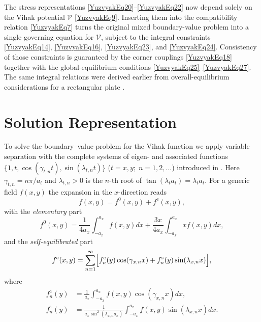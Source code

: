 The stress representations \eqref{YuzvyakEq20}–\eqref{YuzvyakEq22} now
depend solely on the Vihak potential
\(\mathcal{V}\) \eqref{YuzvyakEq9}.  Inserting them into the
compatibility relation \eqref{YuzvyakEq7} turns the original mixed
boundary-value problem into a single governing equation for
\(\mathcal{V}\), subject to the integral constraints
\eqref{YuzvyakEq14}, \eqref{YuzvyakEq16},
\eqref{YuzvyakEq23}, and \eqref{YuzvyakEq24}.  Consistency of those
constraints is guaranteed by the corner couplings
\eqref{YuzvyakEq18} together with the global-equilibrium conditions
\eqref{YuzvyakEq25}–\eqref{YuzvyakEq27}.  The same integral
relations were derived earlier from overall-equilibrium considerations
for a rectangular plate \cite{Yuzvyak32,Yuzvyak33}.

\section{Solution Representation}

To solve the boundary–value problem for the Vihak function we apply
variable separation with the complete systems of eigen- and associated
functions  
\(\{1,t,\cos(\gamma_{t,n}t),\sin(\lambda_{t,n}t)\}\)  
(\(t=x,y;\;n=1,2,\dots\)) introduced in
\cite{Yuzvyak29,Yuzvyak30}.  Here
\(\gamma_{t,n}=n\pi/a_{t}\) and \(\lambda_{t,n}>0\) is the \(n\)-th root
of \(\tan(\lambda_{t}a_{t})=\lambda_{t}a_{t}\).
For a generic field \(f(x,y)\) the expansion in the \(x\)-direction
reads
\begin{equation}
	f(x,y)=f^{0}(x,y)+f^{\mathrm e}(x,y),
	\label{YuzvyakEq28}
\end{equation}
with the \emph{elementary} part
\begin{equation}
	f^{0}(x,y)=
	\frac{1}{4a_{x}}\int_{-a_{x}}^{a_{x}}f(x,y) dx
	+\frac{3x}{4a_{x}}\int_{-a_{x}}^{a_{x}}x f(x,y) dx,
	\label{YuzvyakEq29}
\end{equation}
and the \emph{self-equilibrated} part
\begin{equation}
	f^{\mathrm e}(x,y)=
	\sum_{n=1}^{\infty} \Bigl[
	f_{n}^{\mathrm c}(y)\cos(\gamma_{x,n}x)
	+f_{n}^{\mathrm s}(y)\sin(\lambda_{x,n}x)
	\Bigr],
	\label{YuzvyakEq30}
\end{equation}
where
\begin{equation}\label{YuzvyakEq31}
\begin{array}{ll}
	f_{n}^{\mathrm c}(y)&=\frac{1}{a_{x}}
	\int_{-a_{x}}^{a_{x}}f(x,y)\cos(\gamma_{x,n}x) dx,
	\\
	f_{n}^{\mathrm s}(y)&=\frac{1}{a_{x}\sin^{2}(\lambda_{x,n}a_{x})}
	\int_{-a_{x}}^{a_{x}}f(x,y)\sin(\lambda_{x,n}x) dx.
\end{array}
\end{equation}

